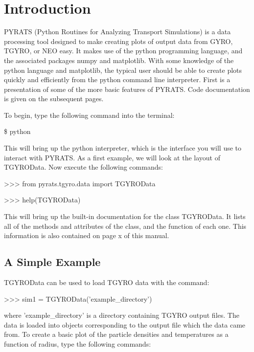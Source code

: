 \documentclass{article}
\begin{document}


\tableofcontents

\newpage

\section{Introduction}PYRATS (Python Routines for Analyzing Transport Simulations) is a data processing tool designed to make creating plots of output data from GYRO, TGYRO, or NEO easy.  It makes use of the python programming language, and the associated packages numpy and matplotlib.  With some knowledge of the python language and matplotlib, the typical user should be able to create plots quickly and efficiently from the python command line interpreter.  First is a presentation of some of the more basic features of PYRATS.  Code documentation is given on the subsequent pages.  

\noindent To begin, type the following command into the terminal:
\fontfamily{\ttdefault}\selectfont

\$ python

\fontfamily{\rmdefault}\selectfont
\noindent This will bring up the python interpreter, which is the interface you will use to interact with PYRATS.  As a first example, we will look at the layout of TGYROData.  Now execute the following commands:
\fontfamily{\ttdefault}\selectfont

>>> from pyrats.tgyro.data import TGYROData
\addtolength{\parskip}{-\baselineskip}

>>> help(TGYROData)

\addtolength{\parskip}{\baselineskip}
\fontfamily{\rmdefault}\selectfont
\noindent This will bring up the built-in documentation for the class TGYROData.  It lists all of the methods and attributes of the class, and the function of each one.  This information is also contained on page x of this manual.

\subsection{A Simple Example}
\noindent TGYROData can be used to load TGYRO data with the command:
\fontfamily{\ttdefault}\selectfont

>>> sim1 = TGYROData('example\_directory')

\fontfamily{\rmdefault}\selectfont
\noindent where 'example\_directory' is a directory containing TGYRO output files.  The data is loaded into objects corresponding to the output file which the data came from.  To create a basic plot of the particle densities and temperatures as a function of radius, type the following commands:
\fontfamily{\ttdefault}\selectfont
\end{document}
